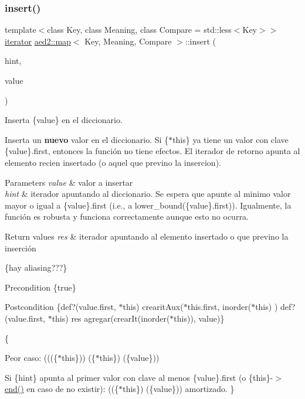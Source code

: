 \subsubsection{\texorpdfstring{insert()}{insert()}\hspace{0.1cm}{\footnotesize\ttfamily [2/4]}}
{\footnotesize\ttfamily template$<$class Key, class Meaning, class Compare = std\+::less$<$\+Key$>$$>$ \\
\hyperlink{classaed2_1_1map_1_1iterator}{iterator} \hyperlink{classaed2_1_1map}{aed2\+::map}$<$ Key, Meaning, Compare $>$\+::insert (\begin{DoxyParamCaption}\item[{\hyperlink{classaed2_1_1map_1_1const__iterator}{const\+\_\+iterator}}]{hint,  }\item[{const \hyperlink{classaed2_1_1map_a719db98e0ff9a837610f76be33264680}{value\+\_\+type} \&}]{value }\end{DoxyParamCaption})\hspace{0.3cm}{\ttfamily [inline]}}



Inserta \{value\} en el diccionario. 

Inserta un {\bfseries nuevo} valor en el diccionario. Si \{$\ast$this\} ya tiene un valor con clave \{value\}.first, entonces la función no tiene efectos. El iterador de retorno apunta al elemento recien insertado (o aquel que previno la insercion).


\begin{DoxyParams}{Parameters}
{\em value} & valor a insertar \\
\hline
{\em hint} & iterador apuntando al diccionario. Se espera que apunte al minimo valor mayor o igual a \{value\}.first (i.\+e., a lower\+\_\+bound(\{value\}.first)). Igualmente, la función es robusta y funciona correctamente aunque esto no ocurra. \\
\hline
\end{DoxyParams}

\begin{DoxyRetVals}{Return values}
{\em res} & iterador apuntando al elemento insertado o que previno la inserción\\
\hline
\end{DoxyRetVals}
\{hay aliasing???\}

\begin{DoxyPrecond}{Precondition}
\{true\} 
\end{DoxyPrecond}
\begin{DoxyPostcond}{Postcondition}
\{def?(value.\+first, $\ast$this)  crearit\+Aux($\ast$this.first, inorder($\ast$this) )   def?(value.\+first, $\ast$this)  res  agregar(crear\+It(inorder($\ast$this)), value)\}
\end{DoxyPostcond}
\{
\begin{DoxyItemize}
\item Peor caso\+: (((\{$\ast$this\}))  (\{$\ast$this\})  (\{value\}))
\item Si \{hint\} apunta al primer valor con clave al menos \{value\}.first (o \{this\}-\/$>$\hyperlink{classaed2_1_1map_a76023e6a56cb625513e1b5ea028bf983}{end()} en caso de no existir)\+: ((\{$\ast$this\})  (\{value\})) amortizado. \}
\end{DoxyItemize}

